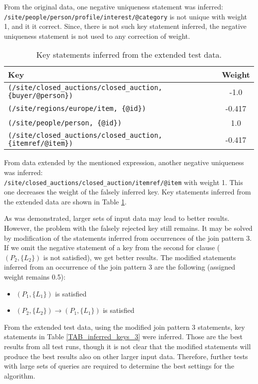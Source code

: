 From the original data, one negative uniqueness statement was inferred:\\
\texttt{/site/people/person/profile/interest/@category} is not unique with weight 1, and it it correct. Since, there is not such key statement inferred, the negative uniqueness statement is not used to any correction of weight.

\begin{table}
\begin{tabular}{|l|c|}
\hline
\textbf{Key} & \textbf{Weight} \\ \hline \hline
\texttt{(/site/closed\_auctions/closed\_auction, \{buyer/@person\})} & -1.0 \\ \hline
\texttt{(/site/regions/europe/item, \{@id\})} & -0.417 \\ \hline
\texttt{(/site/people/person, \{@id\})} & 1.0 \\ \hline
\texttt{(/site/closed\_auctions/closed\_auction, \{itemref/@item\})} & -0.417 \\ \hline
\end{tabular}
\caption{Key statements inferred from the extended test data.}
\label{TAB_inferred_keys_2}
\end{table}

From data extended by the mentioned expression, another negative uniqueness was inferred:\\
\texttt{/site/closed\_auctions/closed\_auction/itemref/@item} with weight 1. This one decreases the weight of the falsely inferred key. Key statements inferred from the extended data are shown in Table \ref{TAB_inferred_keys_2}.

As was demonstrated, larger sets of input data may lead to better results. However, the problem with the falsely rejected key still remains. It may be solved by modification of the statements inferred from occurrences of the join pattern 3. If we omit the negative statement of a key from the second for clause ($(P_2, \{L_2\})$ is not satisfied), we get better results. The modified statements inferred from an occurrence of the join pattern 3 are the following (assigned weight remains 0.5):

\begin{itemize}
\item $(P_1, \{L_1\})$ is satisfied
\item $(P_2, \{L_2\}) \rightarrow (P_1, \{L_1\})$ is satisfied
\end{itemize}

From the extended test data, using the modified join pattern 3 statements, key statements in Table \ref{TAB_inferred_keys_3} were inferred. Those are the best results from all test runs, though it is not clear that the modified statements will produce the best results also on other larger input data. Therefore, further tests with large sets of queries are required to determine the best settings for the algorithm. 

